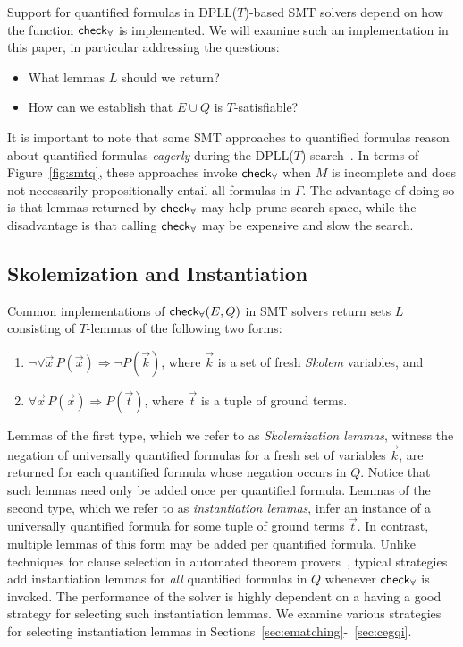 \documentclass[oribibl]{llncs}
\begin{document}
Support for quantified formulas in DPLL($T$)-based SMT solvers depend on how the function $\small\mathsf{check}_\forall$ is implemented.
We will examine such an implementation in this paper, in particular addressing the questions:
\begin{itemize}
\item What lemmas $L$ should we return?
\item How can we establish that $E \cup Q$ is $T$-satisfiable?
\end{itemize}

It is important to note that some SMT approaches to quantified formulas
reason about quantified formulas \emph{eagerly} during the DPLL($T$) search~\cite{MouraBjoerner07}.
In terms of Figure~\ref{fig:smtq}, these approaches invoke $\small\mathsf{check}_\forall$
when $M$ is incomplete and does not necessarily propositionally entail all formulas in $\Gamma$.
The advantage of doing so is that lemmas returned by $\small\mathsf{check}_\forall$ may help prune search space,
while the disadvantage is that calling $\small\mathsf{check}_\forall$ may be expensive and slow the search.

\subsection{Skolemization and Instantiation}
Common implementations of $\small\mathsf{check}_\forall( E, Q )$ in SMT solvers return sets $L$ consisting of $T$-lemmas of the following two forms:
\begin{enumerate}
\item $\neg \forall \vec x\, P( \vec x ) \Rightarrow \neg P( \vec k )$, where $\vec k$ is a set of fresh \emph{Skolem} variables, and
\item $\forall \vec x\, P( \vec x ) \Rightarrow P( \vec t )$, where $\vec t$ is a tuple of ground terms.
\end{enumerate}
Lemmas of the first type, which we refer to as \emph{Skolemization lemmas},
witness the negation of universally quantified formulas for a fresh set of variables $\vec{k}$,
are returned for each quantified formula whose negation occurs in $Q$.
Notice that such lemmas need only be added once per quantified formula.
Lemmas of the second type, which we refer to as \emph{instantiation lemmas},
infer an instance of a universally quantified formula for some tuple of ground terms $\vec{ t }$.
In contrast, multiple lemmas of this form may be added per quantified formula.
Unlike techniques for clause selection in automated theorem provers~\cite{DBLP:conf/cade/SchulzM16},
typical strategies add instantiation lemmas for \emph{all} quantified formulas in $Q$ whenever $\small\mathsf{check}_\forall$ is invoked.
The performance of the solver is highly dependent on a having a good strategy for selecting such instantiation lemmas.
We examine various strategies for selecting instantiation lemmas in Sections~\ref{sec:ematching}-~\ref{sec:cegqi}.
\end{document}
